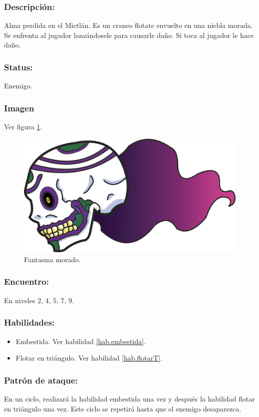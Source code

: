 \documentclass[11pt,letterpaper]{article}
\begin{document}
\subsubsection{Descripción:}
Alma perdida en el Mictlán. Es un craneo flotate envuelto en una niebla morada.
Se enfrenta al jugador lanzándosele para causarle daño. Si toca al jugador le hace daño. 
\subsubsection{Status:}
Enemigo.
\subsubsection{Imagen}
Ver figura \ref{fig:fantasmaM}.
\begin{figure}
	\centering
	\includegraphics[height=0.2 \textheight]{Imagenes/fantasmaMorado}
	\caption{Fantasma morado.}
	\label{fig:fantasmaM}
\end{figure}
\subsubsection{Encuentro:}
En niveles 2, 4, 5, 7, 9.
\subsubsection{Habilidades:}
\begin{itemize}
	\item Embestida. Ver habilidad \ref{hab.embestida}.
	\item Flotar en triángulo. Ver habilidad \ref{hab.flotarT}.
\end{itemize}
\subsubsection{Patrón de ataque:}
En un ciclo, realizará la habilidad embestida una vez y después la habilidad flotar en triángulo una vez. Este ciclo se repetirá hasta que el enemigo desaparezca.
\end{document}
